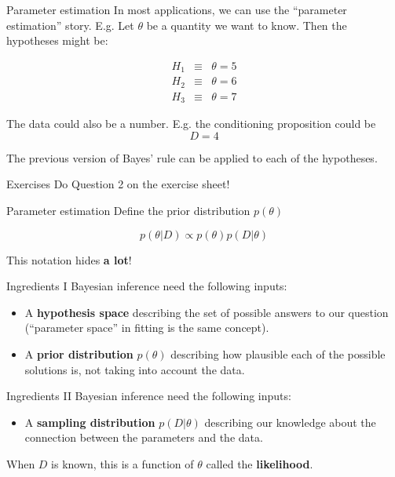 \documentclass{beamer}
\begin{document}
\begin{frame}[t]{Parameter estimation}
In most applications, we can use the ``parameter estimation'' story. E.g.
Let $\theta$ be a quantity we want to know. Then the hypotheses might be:

\begin{eqnarray}
H_1 &\equiv& \theta = 5\\
H_2 &\equiv& \theta = 6\\
H_3 &\equiv& \theta = 7
\end{eqnarray}

The data could also be a number. E.g. the conditioning proposition could be
\begin{equation}
D = 4
\end{equation}

The previous version of Bayes' rule can be applied to each of the
hypotheses.
\end{frame}

\begin{frame}[t]{Exercises}
Do Question 2 on the exercise sheet!
\end{frame}

\begin{frame}[t]{Parameter estimation}
Define the prior distribution $p(\theta)$


\begin{equation}
p(\theta | D) \propto p(\theta)p(D|\theta)
\end{equation}

This notation hides {\bf a lot}!
\end{frame}


\begin{frame}[t]{Ingredients I}
Bayesian inference need the following inputs:

\begin{itemize}
\setlength{\itemsep}{20pt}
\item A {\bf hypothesis space} describing the set of possible answers to our
question (``parameter space'' in fitting is the same concept).
\item A {\bf prior distribution} $p(\theta)$ describing how plausible
each of the possible solutions is, not taking into account the data.
\end{itemize}
\end{frame}

\begin{frame}[t]{Ingredients II}
Bayesian inference need the following inputs:
\begin{itemize}
\item A {\bf sampling distribution} $p(D | \theta)$ describing our knowledge
about the connection between the parameters and the data.
\end{itemize}

When $D$ is known,
this is a function of $\theta$ called the {\bf likelihood}.
\end{frame}
\end{document}
